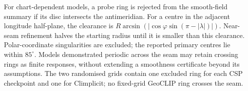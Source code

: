 For chart-dependent models, a probe ring is rejected from the smooth-field summary if its disc intersects the antimeridian. For a centre in the adjacent longitude half-plane, the clearance is $R\arcsin(|\cos\varphi\sin(\pi-|\lambda|)|)$. Near-seam refinement halves the starting radius until it is smaller than this clearance. Polar-coordinate singularities are excluded; the reported primary centres lie within $85^\circ$. Models demonstrated periodic across the seam may retain crossing rings as finite responses, without extending a smoothness certificate beyond its assumptions. The two randomised grids contain one excluded ring for each CSP checkpoint and one for Climplicit; no fixed-grid GeoCLIP ring crosses the seam.
